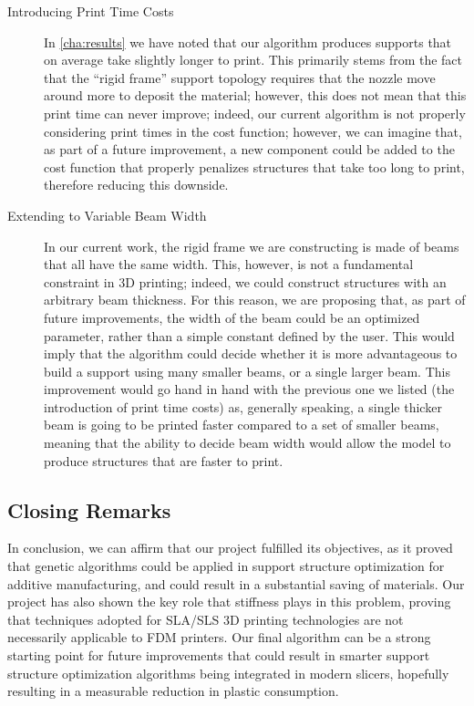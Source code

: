 \begin{description}
    \item[Introducing Print Time Costs] 
    In \cref{cha:results} we have noted that our algorithm produces supports that
    on average take slightly longer to print. This primarily stems from the fact that the ``rigid frame''
    support topology requires that the nozzle move around more to deposit the material; however, this does
    not mean that this print time can never improve; indeed, our current algorithm is not properly
    considering print times in the cost function; however, we can imagine that, as part of a future improvement, a new component
    could be added to the cost function that properly penalizes structures that take too long to print,
    therefore reducing this downside.
    \item[Extending to Variable Beam Width] 
    In our current work, the rigid frame we are constructing is made of beams that all have the same
    width. This, however, is not a fundamental constraint in 3D printing; indeed, we could construct
    structures with an arbitrary beam thickness. For this reason, we are proposing that, as part of future
    improvements, the width of the beam could be an optimized parameter, rather than a simple constant
    defined by the user. This would imply that the algorithm could decide whether it is more advantageous
    to build a support using many smaller beams, or a single larger beam.
    This improvement would go hand in hand with the previous one we listed (the introduction of print time costs)
    as, generally speaking, a single thicker beam is going to be printed faster compared to a set of
    smaller beams, meaning that the ability to decide beam width would allow the model
    to produce structures that are faster to print.
\end{description}

\subsection*{Closing Remarks}

In conclusion, we can affirm that our project fulfilled its objectives,
as it proved that genetic algorithms could be applied in support structure
optimization for additive manufacturing, and could result in a substantial
saving of materials.
Our project has also shown the key role that stiffness plays in this problem,
proving that techniques adopted for SLA/SLS 3D printing technologies are not necessarily
applicable to FDM printers.
Our final algorithm can be a strong starting point for future improvements that could 
result in smarter support structure optimization algorithms being integrated in modern 
slicers, hopefully resulting in a measurable reduction in plastic consumption.



